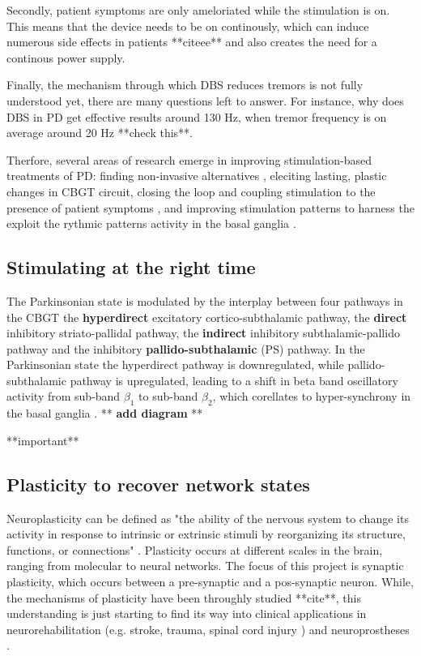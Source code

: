 Secondly, patient symptoms are only ameloriated while the stimulation is on. This means that
the device needs to be on continously, which can induce numerous side effects in patients
**citeee** and also creates the need for a continous power supply.

Finally, the mechanism through which DBS reduces tremors is not fully understood yet, there
are many questions left to answer. For instance, why does DBS in PD get effective results around
130 Hz, when tremor frequency is on average around 20 Hz **check this**.

Therfore, several areas of research emerge in improving stimulation-based treatments of PD:
finding non-invasive alternatives \cite{saturnino2017target, schwab2020spike}, eleciting lasting,
plastic changes in CBGT circuit, closing the loop and coupling stimulation to the presence of
patient symptoms \cite{beudel2018adaptive}, and improving stimulation patterns to harness the
exploit the rythmic patterns activity in the basal ganglia \cite{cagnan2017stimulating, west2022stimulating}.

\subsection{Stimulating at the right time}
The Parkinsonian state is modulated by the interplay between four pathways in the CBGT
the \textbf{hyperdirect} excitatory cortico-subthalamic pathway,
the \textbf{direct} inhibitory striato-pallidal pathway,
the \textbf{indirect} inhibitory subthalamic-pallido pathway and
the inhibitory \textbf{pallido-subthalamic} (PS) pathway. In the Parkinsonian state the hyperdirect
pathway is downregulated, while pallido-subthalamic pathway is upregulated, leading to a shift in
beta band oscillatory activity from sub-band $\beta_1$ to sub-band $\beta_2$, which corellates to
hyper-synchrony in the basal ganglia \cite{west2022stimulating}.
** \textbf{add diagram} **

**important** \cite{cagnan2017stimulating} \cite{beudel2018adaptive} \cite{west2022stimulating}

\subsection{Plasticity to recover network states}
Neuroplasticity can be defined as "the ability of the nervous system to change its activity in
response to intrinsic or extrinsic stimuli by reorganizing its structure, functions, or
connections" \cite{mateos2019impact}.
Plasticity occurs at different scales in the brain, ranging from molecular to neural networks.
The focus of this project is synaptic plasticity, which occurs between a pre-synaptic and a
pos-synaptic neuron. While, the mechanisms of plasticity have been throughly studied **cite**,
this understanding is just starting to find its way into clinical applications in
neurorehabilitation (e.g. stroke, trauma, spinal cord injury \cite{cramer2011harnessing}) and
neuroprostheses \cite{lebedev2017brain}.

